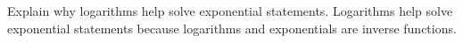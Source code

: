 {Explain why logarithms help solve exponential statements.}
{Logarithms help solve exponential statements because logarithms and exponentials are inverse functions.}
